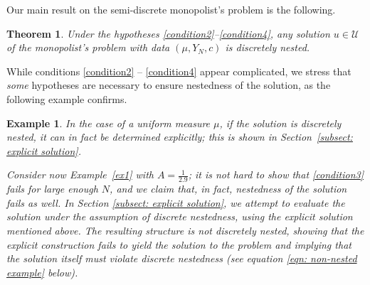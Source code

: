 \documentclass[12pt,reqno]{amsart}
\newtheorem{theorem}{Theorem}
\newtheorem{example}{Example}
\begin{document}

Our main result on the semi-discrete monopolist's problem is the following.
 \begin{theorem}\label{disc}
    Under the hypotheses \ref{condition2}--\ref{condition4}, any solution $u\in \mathcal{U}$ of the monopolist's problem with data $(\mu, Y_N,c)$ is discretely nested. %
 \end{theorem}  
While conditions \ref{condition2} -- \ref{condition4} appear complicated, we stress that \emph{some} hypotheses are necessary to ensure nestedness of the solution, as the following example confirms. 
\begin{example}\label{ex2}
    In the case of a uniform measure $\mu$, \emph{if} the solution is discretely  nested, it can in fact be determined explicitly; this is shown in Section~\ref{subsect: explicit solution}. 
    
    
 Consider now  Example~\ref{ex1} with $A = \frac{1}{2.9}$; it is not hard to show that  \ref{condition3} \emph{fails} for large enough $N$, and we claim that, in fact, nestedness of the solution fails as well. In Section \ref{subsect: explicit solution}, we attempt to evaluate the solution under the assumption of discrete nestedness, using the explicit solution mentioned above.  
The resulting structure is \emph{not} discretely nested, showing that the explicit construction fails to yield the solution to the problem and implying that the solution itself must violate discrete nestedness (see equation \eqref{eqn: non-nested example} below).

\end{example}
\end{document}
